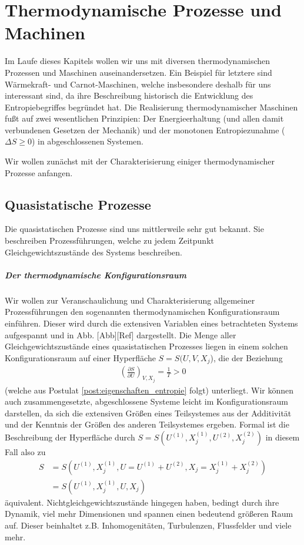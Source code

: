 
\chapter{Thermodynamische Prozesse und Machinen}
Im Laufe dieses Kapitels wollen wir uns mit diversen thermodynamischen Prozessen und Maschinen auseinandersetzen. Ein Beispiel für letztere sind Wärmekraft- und Carnot-Maschinen, welche insbesondere deshalb für uns interessant sind, da ihre Beschreibung historisch die Entwicklung des Entropiebegriffes begründet hat.
Die Realisierung thermodynamischer Maschinen fußt auf zwei wesentlichen Prinzipien: Der Energieerhaltung (und allen damit verbundenen Gesetzen der Mechanik) und der monotonen Entropiezunahme ($\Delta S \geq 0$) in abgeschlossenen Systemen.

Wir wollen zunächst mit der Charakterisierung einiger thermodynamischer Prozesse anfangen.


\section{Quasistatische Prozesse}
Die quasistatischen Prozesse sind uns mittlerweile sehr gut bekannt. Sie beschreiben Prozessführungen, welche zu jedem Zeitpunkt Gleichgewichtszustände des Systems beschreiben.
\paragraph*{Der thermodynamische Konfigurationsraum}
Wir wollen zur Veranschaulichung und Charakterisierung allgemeiner Prozessführungen den sogenannten thermodynamischen Konfigurationsraum einführen. Dieser wird durch die extensiven Variablen eines betrachteten Systems aufgespannt und in Abb. [Abb][Ref] dargestellt.
Die Menge aller Gleichgewichtszustände eines quasistatischen Prozesses liegen in einem solchen Konfigurationsraum auf einer Hyperfläche $S=S(U,V,X_j$), die der Beziehung 
\begin{align*}
    \left(\frac{\partial S}{\partial U}\right)_{V,X_j}=\frac{1}{T}>0
\end{align*}
(welche aus Postulat \ref{post:eigenschaften_entropie} folgt) unterliegt.  
Wir können auch zusammengesetzte, abgeschlossene Systeme leicht im Konfigurationsraum darstellen, da sich die extensiven Größen eines Teilsystemes aus der Additivität und der Kenntnis der Größen des anderen Teilsystemes ergeben. Formal ist die Beschreibung der Hyperfläche durch $S=S(U^{(1)},X_j^{(1)},U^{(2)},X_j^{(2)})$ in diesem Fall also zu 
\begin{align*}
    S&=S(U^{(1)},X_j^{(1)},U=U^{(1)}+U^{(2)},X_j=X_j^{(1)}+X_j^{(2)})\\
    &=S(U^{(1)},X_j^{(1)},U,X_j)
\end{align*}
äquivalent.
Nichtgleichgewichtszustände hingegen haben, bedingt durch ihre Dynamik, viel mehr Dimensionen und spannen einen bedeutend größeren Raum auf. Dieser beinhaltet z.B. Inhomogenitäten, Turbulenzen, Flussfelder und viele mehr. 

